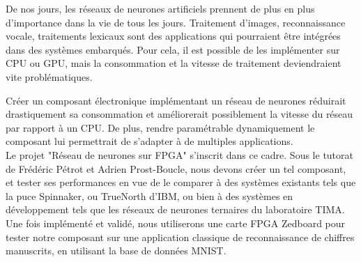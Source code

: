 De nos jours, les réseaux de neurones artificiels prennent de plus en plus d'importance
dans la vie de tous les jours. Traitement d'images, reconnaissance vocale, traitements lexicaux sont
des applications qui pourraient être intégrées dans des systèmes embarqués. Pour cela, il est possible 
de les implémenter sur CPU ou GPU, mais la consommation et la vitesse de traitement deviendraient vite problématiques.

Créer un composant électronique implémentant un réseau de neurones réduirait drastiquement sa consommation
et améliorerait possiblement la vitesse du réseau par rapport à un CPU. De plus, rendre paramétrable dynamiquement le
composant lui permettrait de s'adapter à de multiples applications.\\

Le projet "Réseau de neurones sur FPGA" s'inscrit dans ce cadre. Sous le tutorat
de Frédéric Pétrot et Adrien Prost-Boucle, nous devons créer un tel composant,
et tester ses performances en vue de le comparer à des systèmes existants tels
que la puce Spinnaker, ou TrueNorth d'IBM, ou bien à des systèmes en développement
tels que les réseaux de neurones ternaires du laboratoire TIMA. Une fois
implémenté et validé, nous utiliserons une carte FPGA Zedboard pour tester notre
composant sur une application classique de reconnaissance de chiffres manuscrits,
en utilisant la base de données MNIST.
